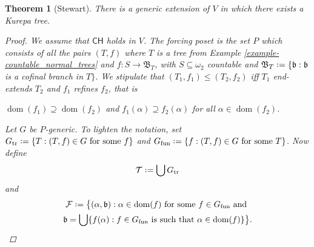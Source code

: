 \documentclass[11pt,a4paper]{report}
\newtheorem{theorem}{Theorem}[chapter] %
\theoremstyle{definition}
\theoremstyle{num.custom-title}
\theoremstyle{custom-title}
\DeclareMathOperator{\dom}{dom}
\DeclareMathOperator{\sse}{\subseteq}
\newcommand{\CH}{\ensuremath{\mathsf{CH}}\xspace}
\newcommand{\F}{\mathcal{F}}
\newcommand{\T}{\mathcal{T}}
\newcommand*{\defeq}{\mathrel{\rlap{%
                     \raisebox{0.3ex}{$\cdot$}}%
                     \raisebox{-0.3ex}{$\cdot$}}%
                     =}
\begin{document}
\begin{theorem}[Stewart]\label{thm-forcing_a_kurepa_tree}
There is a generic extension of $V$ in which there exists a Kurepa tree. 
\begin{proof}
We assume that \CH holds in $V$. The forcing poset is the set $P$ which consists of all the pairs $(T,f)$ where $T$ is a tree from Example \ref{example-countable_normal_trees} and $f \colon S \to \mathfrak{B}_T$, with $S \sse \omega_2$ countable and $\mathfrak{B}_T \defeq \{\mathfrak{b} : \mathfrak{b}$ is a cofinal branch in $T \}$. We stipulate that $(T_1,f_1) \leq (T_2,f_2)$ iff $T_1$ end-extends $T_2$ and $f_1$ \emph{refines} $f_2$, that is
\begin{center}
$\dom(f_1) \supseteq \dom(f_2)$ \quad and \quad $f_1(\alpha) \supseteq f_2(\alpha)$ for all $\alpha \in \dom(f_2)$.
\end{center}
Let $G$ be $P$-generic. To lighten the notation, set $G_{\text{tr}} \defeq \{T : (T,f) \in G \text{ for some } f\}$ and $G_{\text{fun}} \defeq \{f : (T,f) \in G \text{ for some } T\}$. Now define
\[
\T \defeq \bigcup G_{\text{tr}}
\]
and
\begin{multline*}
\F \defeq \big\{ (\alpha, \mathfrak{b}) : \alpha \in \dom(f) \text{ for some } f \in G_{\text{fun}} \text{ and } \\
\mathfrak{b} = \bigcup \{f(\alpha) : f \in G_{\text{fun}} \text{ is such that } \alpha \in \dom(f)\} \big\}.
\end{multline*}


\end{proof}
\end{theorem}
\end{document}
